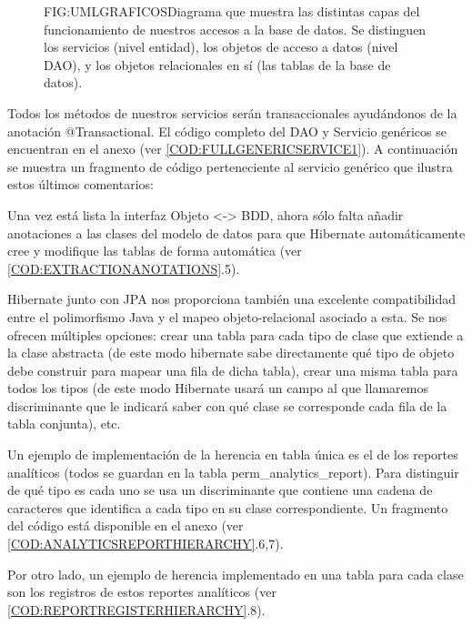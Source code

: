 \begin{figure}[Diagrama de funcionamiento Spring + Hibernate + JPA]{FIG:UMLGRAFICOS}{Diagrama que muestra las distintas capas del funcionamiento de nuestros accesos a la base de datos. Se distinguen los servicios (nivel entidad), los objetos de acceso a datos (nivel DAO), y los objetos relacionales en sí (las tablas de la base de datos).}
\end{figure}

Todos los métodos de nuestros servicios serán transaccionales ayudándonos de la anotación @Transactional. El código completo del DAO y Servicio genéricos se encuentran en el anexo (ver \cref{COD:FULLGENERICSERVICE1}). A continuación se muestra un fragmento de código perteneciente al servicio genérico que ilustra estos últimos comentarios:\newpage


Una vez está lista la interfaz Objeto <->  BDD, ahora sólo falta añadir anotaciones a las clases del modelo de datos para que Hibernate automáticamente cree y modifique las tablas de forma automática (ver \cref{COD:EXTRACTIONANOTATIONS}.5). 

Hibernate junto con JPA nos proporciona también una excelente compatibilidad entre el polimorfismo Java y el mapeo objeto-relacional asociado a esta.
Se nos ofrecen múltiples opciones: crear una tabla para cada tipo de clase que extiende a la clase abstracta (de este modo hibernate sabe directamente qué tipo de objeto debe construir para mapear una fila de dicha tabla), crear una misma tabla para todos los tipos (de este modo Hibernate usará un campo al que llamaremos discriminante que le indicará saber con qué clase se corresponde cada fila de la tabla conjunta), etc. 

Un ejemplo de implementación de la herencia en tabla única es el de los reportes analíticos (todos se guardan en la tabla perm\_analytics\_report). Para distinguir de qué tipo es cada uno se usa un discriminante que contiene una cadena de caracteres que identifica a cada tipo en su clase correspondiente. Un fragmento del código está disponible en el anexo (ver \cref{COD:ANALYTICSREPORTHIERARCHY}.6,7).

Por otro lado, un ejemplo de herencia implementado en una tabla para cada clase son los registros de estos reportes analíticos (ver \cref{COD:REPORTREGISTERHIERARCHY}.8). \newpage

